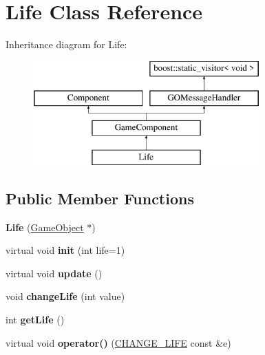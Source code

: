 \hypertarget{class_life}{}\section{Life Class Reference}
\label{class_life}
Inheritance diagram for Life\+:\begin{figure}[H]
\begin{center}
\leavevmode
\includegraphics[height=4.000000cm]{class_life}
\end{center}
\end{figure}
\subsection*{Public Member Functions}
\begin{DoxyCompactItemize}
\item 
\hypertarget{class_life_ad5a065168648ef6114eee8851c63a9e0}{}\label{class_life_ad5a065168648ef6114eee8851c63a9e0} 
{\bfseries Life} (\hyperlink{class_game_object}{Game\+Object} $\ast$)
\item 
\hypertarget{class_life_a38250d67d459d3887e8d5adddf6b5129}{}\label{class_life_a38250d67d459d3887e8d5adddf6b5129} 
virtual void {\bfseries init} (int life=1)
\item 
\hypertarget{class_life_a0e00f2735584f3ddebb397742b520d3b}{}\label{class_life_a0e00f2735584f3ddebb397742b520d3b} 
virtual void {\bfseries update} ()
\item 
\hypertarget{class_life_a5058223a20871cf287b7f75ce2eb44ef}{}\label{class_life_a5058223a20871cf287b7f75ce2eb44ef} 
void {\bfseries change\+Life} (int value)
\item 
\hypertarget{class_life_a6bbbcb718407c98ce6c031c81685a659}{}\label{class_life_a6bbbcb718407c98ce6c031c81685a659} 
int {\bfseries get\+Life} ()
\item 
\hypertarget{class_life_ab33e0ff7003ed8c066d61ddb65ffc321}{}\label{class_life_ab33e0ff7003ed8c066d61ddb65ffc321} 
virtual void {\bfseries operator()} (\hyperlink{struct_c_h_a_n_g_e___l_i_f_e}{C\+H\+A\+N\+G\+E\+\_\+\+L\+I\+FE} const \&e)
\end{DoxyCompactItemize}
